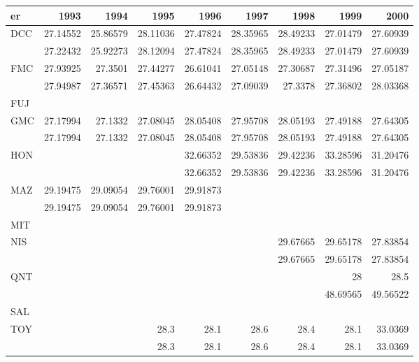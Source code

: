 \begin{tabular}{lrrrrrrrr}
\toprule
er & 1993 & 1994 & 1995 & 1996 & 1997 & 1998 & 1999 & 2000 \\
\midrule
DCC & 27.14552 & 25.86579 & 28.11036 & 27.47824 & 28.35965 & 28.49233 & 27.01479 & 27.60939 \\
 & 27.22432 & 25.92273 & 28.12094 & 27.47824 & 28.35965 & 28.49233 & 27.01479 & 27.60939 \\
FMC & 27.93925 & 27.3501 & 27.44277 & 26.61041 & 27.05148 & 27.30687 & 27.31496 & 27.05187 \\
 & 27.94987 & 27.36571 & 27.45363 & 26.64432 & 27.09039 & 27.3378 & 27.36802 & 28.03368 \\
FUJ &  &  &  &  &  &  &  &  \\
GMC & 27.17994 & 27.1332 & 27.08045 & 28.05408 & 27.95708 & 28.05193 & 27.49188 & 27.64305 \\
 & 27.17994 & 27.1332 & 27.08045 & 28.05408 & 27.95708 & 28.05193 & 27.49188 & 27.64305 \\
HON &  &  &  & 32.66352 & 29.53836 & 29.42236 & 33.28596 & 31.20476 \\
 &  &  &  & 32.66352 & 29.53836 & 29.42236 & 33.28596 & 31.20476 \\
MAZ & 29.19475 & 29.09054 & 29.76001 & 29.91873 &  &  &  &  \\
 & 29.19475 & 29.09054 & 29.76001 & 29.91873 &  &  &  &  \\
MIT &  &  &  &  &  &  &  &  \\
NIS &  &  &  &  &  & 29.67665 & 29.65178 & 27.83854 \\
 &  &  &  &  &  & 29.67665 & 29.65178 & 27.83854 \\
QNT &  &  &  &  &  &  & 28 & 28.5 \\
 &  &  &  &  &  &  & 48.69565 & 49.56522 \\
SAL &  &  &  &  &  &  &  &  \\
TOY &  &  & 28.3 & 28.1 & 28.6 & 28.4 & 28.1 & 33.0369 \\
 &  &  & 28.3 & 28.1 & 28.6 & 28.4 & 28.1 & 33.0369 \\
\bottomrule
\end{tabular}

